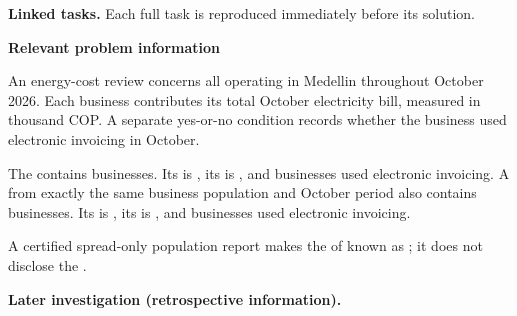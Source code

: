 \textbf{Linked tasks.} Each full task is reproduced immediately before its solution.


\clearpage



\textbf{Relevant problem information}

\begin{probleminfoexcerpt}
An energy-cost review concerns all     operating in Medellin throughout October 2026. Each business contributes its total October electricity bill, measured in thousand COP. A separate yes-or-no condition records whether the business used electronic invoicing in October.
\end{probleminfoexcerpt}

\begin{probleminfoexcerpt}
The     contains  businesses. Its   is   , its    is   , and  businesses used electronic invoicing. A     from exactly the same business population and October period also contains  businesses. Its   is   , its    is   , and  businesses used electronic invoicing.
\end{probleminfoexcerpt}

\begin{probleminfoexcerpt}
A certified spread-only population report makes the    of  known as   ; it does not disclose the   .
\end{probleminfoexcerpt}

\textbf{Later investigation (retrospective information).}

